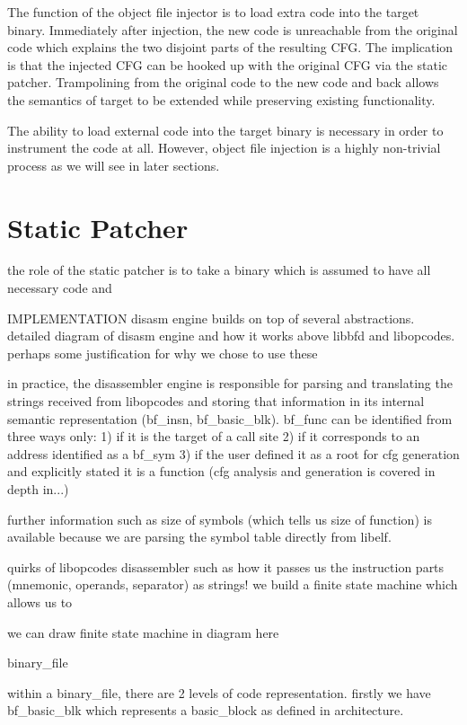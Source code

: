 The function of the object file injector is to load extra code into the target binary. Immediately after injection, the new code is unreachable from the original code which explains the two disjoint parts of the resulting CFG. The implication is that the injected CFG can be hooked up with the original CFG via the static patcher. Trampolining from the original code to the new code and back allows the semantics of target to be extended while preserving existing functionality.

The ability to load external code into the target binary is necessary in order to instrument the code at all. However, object file injection is a highly non-trivial process as we will see in later sections.

\section{Static Patcher}

the role of the static patcher is to take a binary which is assumed to have all necessary code and 

IMPLEMENTATION
disasm engine builds on top of several abstractions. detailed diagram of disasm engine and how it works above libbfd and libopcodes. perhaps some justification for why we chose to use these

in practice, the disassembler engine is responsible for parsing and translating the strings received from libopcodes and storing that information in its internal semantic representation (bf\_insn, bf\_basic\_blk). bf\_func can be identified from three ways only:
1) if it is the target of a call site
2) if it corresponds to an address identified as a bf\_sym
3) if the user defined it as a root for cfg generation and explicitly stated it is a function (cfg analysis and generation is covered in depth in...)

further information such as size of symbols (which tells us size of function) is available because we are parsing the symbol table directly from libelf.

quirks of libopcodes disassembler such as how it passes us the instruction parts (mnemonic, operands, separator) as strings! we build a finite state machine which allows us to 

we can draw finite state machine in diagram here

binary\_file

within a binary\_file, there are 2 levels of code representation. firstly we have bf\_basic\_blk which represents a basic\_block as defined in architecture.

